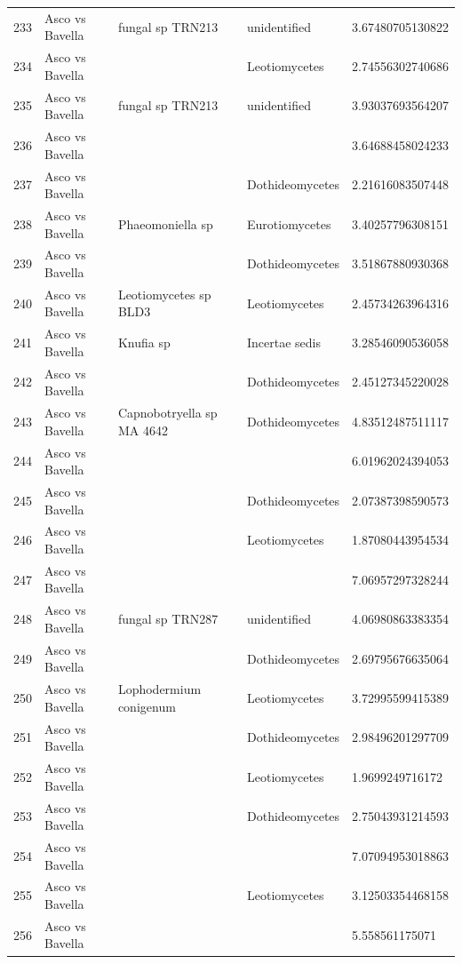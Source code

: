 \documentclass[12pt]{article}\usepackage[]{graphicx}\usepackage[]{color}
\numberwithin{figure}{section}
\begin{document}
\begin{table}[ht]
\begin{tabular}{lllll}
  233 & Asco vs Bavella & fungal sp TRN213 & unidentified & 3.67480705130822 \\ 
  234 & Asco vs Bavella &  & Leotiomycetes & 2.74556302740686 \\ 
  235 & Asco vs Bavella & fungal sp TRN213 & unidentified & 3.93037693564207 \\ 
  236 & Asco vs Bavella &  &  & 3.64688458024233 \\ 
  237 & Asco vs Bavella &  & Dothideomycetes & 2.21616083507448 \\ 
  238 & Asco vs Bavella & Phaeomoniella sp & Eurotiomycetes & 3.40257796308151 \\ 
  239 & Asco vs Bavella &  & Dothideomycetes & 3.51867880930368 \\ 
  240 & Asco vs Bavella & Leotiomycetes sp BLD3 & Leotiomycetes & 2.45734263964316 \\ 
  241 & Asco vs Bavella & Knufia sp & Incertae sedis & 3.28546090536058 \\ 
  242 & Asco vs Bavella &  & Dothideomycetes & 2.45127345220028 \\ 
  243 & Asco vs Bavella & Capnobotryella sp MA 4642 & Dothideomycetes & 4.83512487511117 \\ 
  244 & Asco vs Bavella &  &  & 6.01962024394053 \\ 
  245 & Asco vs Bavella &  & Dothideomycetes & 2.07387398590573 \\ 
  246 & Asco vs Bavella &  & Leotiomycetes & 1.87080443954534 \\ 
  247 & Asco vs Bavella &  &  & 7.06957297328244 \\ 
  248 & Asco vs Bavella & fungal sp TRN287 & unidentified & 4.06980863383354 \\ 
  249 & Asco vs Bavella &  & Dothideomycetes & 2.69795676635064 \\ 
  250 & Asco vs Bavella & Lophodermium conigenum & Leotiomycetes & 3.72995599415389 \\ 
  251 & Asco vs Bavella &  & Dothideomycetes & 2.98496201297709 \\ 
  252 & Asco vs Bavella &  & Leotiomycetes & 1.9699249716172 \\ 
  253 & Asco vs Bavella &  & Dothideomycetes & 2.75043931214593 \\ 
  254 & Asco vs Bavella &  &  & 7.07094953018863 \\ 
  255 & Asco vs Bavella &  & Leotiomycetes & 3.12503354468158 \\ 
  256 & Asco vs Bavella &  &  & 5.558561175071 \\ 

\end{tabular}
\end{table}
\end{document}
